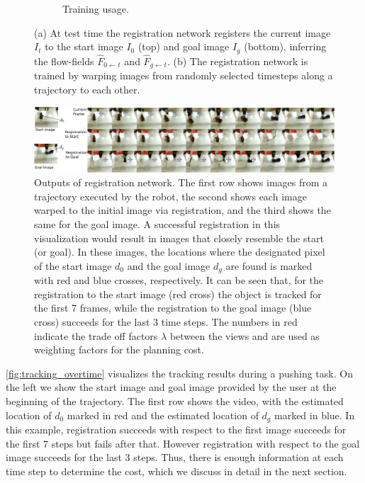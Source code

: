 \begin{figure}[t!]
\begin{subfigure}[b]{0.55\textwidth}
        \caption{\small{Training usage.}}
        \label{fig:discrete}
    \end{subfigure}
    \vspace{-1mm}
    \caption{\small{(a) At test time the registration network registers the current image $I_t$ to the start image $I_0$ (top) and goal image $I_g$ (bottom), inferring the flow-fields $\hat{F}_{0 \leftarrow t}$ and $\hat{F}_{g \leftarrow t}$. (b) The registration network is trained by warping images from randomly selected timesteps along a trajectory to each other.
    }}
    \label{fig:registration_arch}
\end{figure}

\begin{figure}
    \centering
    \vspace{-0.1in}
    \includegraphics[width=1\textwidth]{images/registration_overtime.pdf}
    \caption{\small{Outputs of registration network. The first row shows images from a trajectory executed by the robot, the second shows each image warped to the initial image via registration, and the third shows the same for the goal image. A successful registration in this visualization would result in images that closely resemble the start (or goal). In these images, the locations where the designated pixel of the start image $d_0$ and the goal image $d_g$ are found is marked with red and blue crosses, respectively. It can be seen that, for the registration to the start image (red cross) the object is tracked for the first 7 frames, while the registration to the goal image (blue cross) succeeds for the last 3 time steps. The numbers in red indicate the trade off factors $\lambda$ between the views and are used as weighting factors for the planning cost.}}
    \label{fig:tracking_overtime}
    \vspace{-0.2in}
\end{figure}

\autoref{fig:tracking_overtime} visualizes the tracking results during a pushing task. On the left we show the start image and goal image provided by the user at the beginning of the trajectory. The first row shows the video, with the estimated location of $d_0$ marked in red and the estimated location of $d_g$ marked in blue. In this example, registration succeeds with respect to the first image succeeds for the first 7 steps but fails after that. However registration with respect to the goal image succeeds for the last 3 steps. Thus, there is enough information at each time step to determine the cost, which we discuss in detail in the next section.

